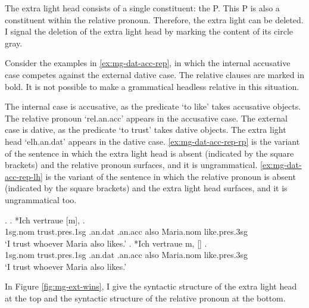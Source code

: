 The extra light head consists of a single constituent: the P.
This P is also a constituent within the relative pronoun. Therefore, the extra light can be deleted. I signal the deletion of the extra light head by marking the content of its circle gray.

Consider the examples in \ref{ex:mg-dat-acc-rep}, in which the internal accusative case competes against the external dative case. The relative clauses are marked in bold. It is not possible to make a grammatical headless relative in this situation.

The internal case is accusative, as the predicate  `to like' takes accusative objects. The relative pronoun  `\ac{rel}.\ac{an}.\ac{acc}' appears in the accusative case.
The external case is dative, as the predicate  `to trust' takes dative objects. The extra light head  `\ac{elh}.\ac{an}.\ac{dat}' appears in the dative case.
\ref{ex:mg-dat-acc-rep-rp} is the variant of the sentence in which the extra light head is absent (indicated by the square brackets) and the relative pronoun surfaces, and it is ungrammatical.
\ref{ex:mg-dat-acc-rep-lh} is the variant of the sentence in which the relative pronoun is absent (indicated by the square brackets) and the extra light head surfaces, and it is ungrammatical too.

\ex.\label{ex:mg-dat-acc-rep}
\ag. *Ich vertraue [m],    .\\
1\ac{sg}.\ac{nom} trust.\ac{pres}.1\ac{sg}\scsub{[dat]} .\ac{an}.\ac{dat} .\ac{an}.\ac{acc} also Maria.\ac{nom} like.\ac{pres}.3\ac{sg}\scsub{[acc]}\\
`I trust whoever Maria also likes.' \label{ex:mg-dat-acc-rep-rp}
\bg. *Ich vertraue m, []   .\\
1\ac{sg}.\ac{nom} trust.\ac{pres}.1\ac{sg}\scsub{[dat]} .\ac{an}.\ac{dat} .\ac{an}.\ac{acc} also Maria.\ac{nom} like.\ac{pres}.3\ac{sg}\scsub{[acc]}\\
`I trust whoever Maria also likes.' \label{ex:mg-dat-acc-rep-lh}

In Figure \ref{fig:mg-ext-wins}, I give the syntactic structure of the extra light head at the top and the syntactic structure of the relative pronoun at the bottom.

